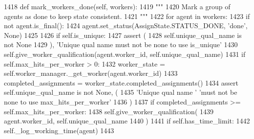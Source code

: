 \begin{DoxyCode}
1418     \textcolor{keyword}{def }mark\_workers\_done(self, workers):
1419         \textcolor{stringliteral}{"""}
1420 \textcolor{stringliteral}{        Mark a group of agents as done to keep state consistent.}
1421 \textcolor{stringliteral}{        """}
1422         \textcolor{keywordflow}{for} agent \textcolor{keywordflow}{in} workers:
1423             \textcolor{keywordflow}{if} \textcolor{keywordflow}{not} agent.is\_final():
1424                 agent.set\_status(AssignState.STATUS\_DONE, \textcolor{stringliteral}{'done'}, \textcolor{keywordtype}{None})
1425 
1426             \textcolor{keywordflow}{if} self.is\_unique:
1427                 \textcolor{keyword}{assert} (
1428                     self.unique\_qual\_name \textcolor{keywordflow}{is} \textcolor{keywordflow}{not} \textcolor{keywordtype}{None}
1429                 ), \textcolor{stringliteral}{'Unique qual name must not be none to use is\_unique'}
1430                 self.give\_worker\_qualification(agent.worker\_id, self.unique\_qual\_name)
1431             \textcolor{keywordflow}{if} self.max\_hits\_per\_worker > 0:
1432                 worker\_state = self.worker\_manager.\_get\_worker(agent.worker\_id)
1433                 completed\_assignments = worker\_state.completed\_assignments()
1434                 \textcolor{keyword}{assert} self.unique\_qual\_name \textcolor{keywordflow}{is} \textcolor{keywordflow}{not} \textcolor{keywordtype}{None}, (
1435                     \textcolor{stringliteral}{'Unique qual name '} \textcolor{stringliteral}{'must not be none to use max\_hits\_per\_worker'}
1436                 )
1437                 \textcolor{keywordflow}{if} completed\_assignments >= self.max\_hits\_per\_worker:
1438                     self.give\_worker\_qualification(
1439                         agent.worker\_id, self.unique\_qual\_name
1440                     )
1441             \textcolor{keywordflow}{if} self.has\_time\_limit:
1442                 self.\_log\_working\_time(agent)
1443 
\end{DoxyCode}
\mbox{\label{classparlai_1_1mturk_1_1core_1_1dev_1_1mturk__manager_1_1MTurkManager_a5d94348203b9b4966f99e322dcba34ba}} 
